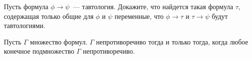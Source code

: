 \begin{ptask}{6}
    Пусть формула $\phi \rightarrow \psi$~--- тавтология. Докажите,
    что найдется такая формула $\tau$, содержащая только общие для
    $\phi$ и $\psi$ переменные, что $\phi \rightarrow \tau$ и
    $\tau \rightarrow \psi$ будут тавтологиями.
\end{ptask}

\begin{ptask}{7}
    Пусть $\Gamma$ множество формул. $\Gamma$ непротиворечиво тогда и
    только тогда, когда любое конечное подмножество $\Gamma$ непротиворечиво.
\end{ptask}